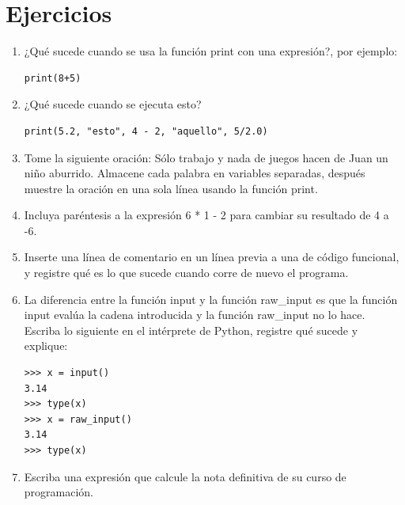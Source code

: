 \begin{description}
   
  
  
   
  
\end{description}

\section{Ejercicios}
\begin{enumerate}
\item ¿Qué sucede cuando se usa la función print con una expresión?, por
ejemplo: 
\begin{verbatim}
print(8+5)
\end{verbatim}
\item ¿Qué sucede cuando se ejecuta esto?
\begin{verbatim}
print(5.2, "esto", 4 - 2, "aquello", 5/2.0)
\end{verbatim}
\item Tome la siguiente oración: Sólo trabajo y nada de juegos hacen de
Juan un niño aburrido. Almacene cada palabra en variables separadas,
después muestre la oración en una sola línea usando la función print.
\item Incluya paréntesis a la expresión 6 {*} 1 - 2 para cambiar su resultado
de 4 a -6.
\item Inserte una línea de comentario en un línea previa a una de código
funcional, y registre qué es lo que sucede cuando corre de nuevo el
programa.
\item La diferencia entre la función input y la función raw\_input es que
la función input evalúa la cadena introducida y la función raw\_input
no lo hace. Escriba lo siguiente en el intérprete de Python, registre
qué sucede y explique:

\begin{verbatim}
>>> x = input()
3.14
>>> type(x)
>>> x = raw_input()
3.14
>>> type(x)
\end{verbatim}
\item Escriba una expresión que calcule la nota definitiva de su curso de
programación.
\end{enumerate}